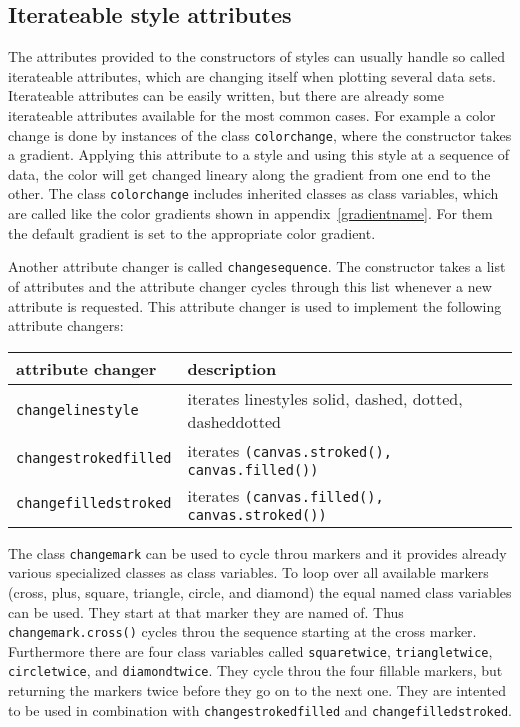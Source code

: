 \subsection{Iterateable style attributes}
\label{graph:changeattrs}

The attributes provided to the constructors of styles can usually
handle so called iterateable attributes, which are changing itself
when plotting several data sets. Iterateable attributes can be easily
written, but there are already some iterateable attributes available
for the most common cases. For example a color change is done by
instances of the class \verb|colorchange|, where the constructor takes
a gradient. Applying this attribute to a style and using this style at
a sequence of data, the color will get changed lineary along the
gradient from one end to the other. The class \verb|colorchange|
includes inherited classes as class variables, which are called like
the color gradients shown in appendix~\ref{gradientname}. For them the
default gradient is set to the appropriate color gradient.

Another attribute changer is called \verb|changesequence|. The
constructor takes a list of attributes and the attribute changer
cycles through this list whenever a new attribute is requested.
This attribute changer is used to implement the following attribute
changers:

\begin{center}
\begin{tabular}{ll}
attribute changer&description\\
\hline
\texttt{changelinestyle}&iterates linestyles solid, dashed, dotted, dasheddotted\\
\texttt{changestrokedfilled}&iterates \texttt{(canvas.stroked(), canvas.filled())}\\
\texttt{changefilledstroked}&iterates \texttt{(canvas.filled(), canvas.stroked())}\\
\end{tabular}
\end{center}

The class \verb|changemark| can be used to cycle throu markers and it
provides already various specialized classes as class variables. To
loop over all available markers (cross, plus, square, triangle,
circle, and diamond) the equal named class variables can be used. They
start at that marker they are named of. Thus \verb|changemark.cross()|
cycles throu the sequence starting at the cross marker. Furthermore
there are four class variables called \verb|squaretwice|,
\verb|triangletwice|, \verb|circletwice|, and \verb|diamondtwice|.
They cycle throu the four fillable markers, but returning the markers
twice before they go on to the next one. They are intented to be used
in combination with \verb|changestrokedfilled| and
\verb|changefilledstroked|.

